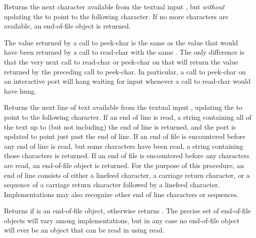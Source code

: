\begin{entry}{
}

Returns the next character available from the textual input ,
but {\em without} updating
the  to point to the following character.  If no more characters
are available, an end-of-file object is returned.

\begin{note}
The value returned by a call to {\cf peek-char} is the same as the
value that would have been returned by a call to {\cf read-char} with the
same .  The only difference is that the very next call to
{\cf read-char} or {\cf peek-char} on that  will return the
value returned by the preceding call to {\cf peek-char}.  In particular, a call
to {\cf peek-char} on an interactive port will hang waiting for input
whenever a call to {\cf read-char} would have hung.
\end{note}

\end{entry}

\begin{entry}{
}

Returns the next line of text available from the textual input
, updating the  to point to the following character.
If an end of line is read, a string containing all of the text up to
(but not including) the end of line is returned, and the port is updated
to point just past the end of line. If an end of file is encountered
before any end of line is read, but some characters have been
read, a string containing those characters is returned. If an end of
file is encountered before any characters are read, an end-of-file
object is returned.  For the purpose of this procedure, an end of line
consists of either a linefeed character, a carriage return character, or a
sequence of a carriage return character followed by a linefeed character.
Implementations may also recognize other end of line characters or sequences.

\end{entry}


\begin{entry}{
}

Returns \schtrue{} if  is an end-of-file object, otherwise returns
\schfalse.  The precise set of end-of-file objects will vary among
implementations, but in any case no end-of-file object will ever be an object
that can be read in using {\cf read}.

\end{entry}

